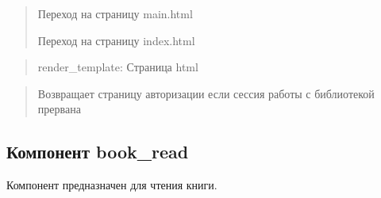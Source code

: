 \documentclass[letterpaper,10pt,russian]{sphinxmanual}
\begin{document}
\begin{fulllineitems}
\begin{description}
\begin{quote}
\begin{description}
\sphinxAtStartPar
Переход на страницу main.html

\sphinxAtStartPar
Переход на страницу index.html

\end{description}\end{quote}

\end{description}
\begin{quote}\begin{description}
\sphinxAtStartPar
render\_template:  Страница html

\end{description}\end{quote}
\begin{description}
\begin{quote}\begin{description}
\sphinxAtStartPar
Возвращает страницу авторизации если сессия работы с библиотекой прервана

\end{description}\end{quote}

\end{description}

\end{fulllineitems}



\subsection{Компонент book\_read}
\label{\detokenize{blueprints:book-read}}
\begin{DUlineblock}{0em}
\item[] Компонент предназначен для чтения книги.
\end{DUlineblock}
\label{\detokenize{blueprints:module-blueprints.book_read}}
\end{document}

